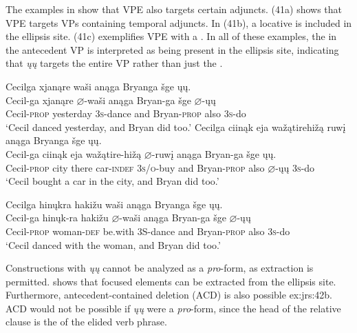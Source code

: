 \documentclass[output=paper]{LSP/langsci}
\begin{document}
The examples in  show that VPE also targets certain adjuncts. (41a) shows that VPE targets VPs containing temporal adjuncts. In (41b), a locative  is included in the ellipsis site. (41c) exemplifies VPE with a . In all of these examples, the  in the antecedent VP is interpreted as being present in the ellipsis site, indicating that \textit{\k{u}\k{u}} targets the entire VP rather than just the .

\begin{exe}
\ex\label{ex:jrs:41}
\begin{xlist}
\ex 
\glll Cecilga 			xjanąre		wa\v{s}i anąga	Bryanga			\v{s}ge  	\k{u}\k{u}.\\
Cecil-ga			xjanąre		$\varnothing$-wa\v{s}i		anąga	Bryan-ga			\v{s}ge		$\varnothing$-\k{u}\k{u} \\
	Cecil-\textsc{prop}		yesterday	\textsc{3s}-dance	and			Bryan-\textsc{prop}	also	\textsc{3s}-do \\
\trans `Cecil danced yesterday, and Bryan did too.'
\ex 
\glll Cecilga 			ciinąk	eja		wa\v{z}ątirehi\v{z}ą		ruw\k{i}	anąga	Bryanga			\v{s}ge  \k{u}\k{u}. \\
Cecil-ga			ciinąk	eja		wa\v{z}ątire-hi\v{z}ą	$\varnothing$-ruw\k{i}			anąga	Bryan-ga	\v{s}ge \k{u}\k{u}. \\
Cecil-\textsc{prop}	city there	car-\textsc{indef}	\textsc{3s/o}-buy and Bryan-\textsc{prop}	also $\varnothing$-\k{u}\k{u} \textsc{3s}-do \\
\trans `Cecil bought a car in the city, and Bryan did too.'

\ex 
\glll Cecilga 		hin\k{u}kra	haki\v{z}u		wa\v{s}i		anąga	Bryanga			\v{s}ge		\k{u}\k{u}.\\
Cecil-ga		hin\k{u}k-ra	haki\v{z}u		$\varnothing$-wa\v{s}i		anąga	Bryan-ga	\v{s}ge		$\varnothing$-\k{u}\k{u} \\	Cecil-\textsc{prop}		woman-\textsc{def} 	be.with		3S-dance	and			Bryan-\textsc{prop}	also	\textsc{3s}-do \\
\trans `Cecil danced with the woman, and Bryan did too.'
\end{xlist}
\end{exe}

Constructions with \textit{\k{u}\k{u}} cannot be analyzed as a \textit{pro}-form, as  extraction is permitted.  shows that focused elements can be extracted from the ellipsis site. Furthermore, antecedent-contained deletion (ACD) is also possible {ex:jrs:42b}. ACD would not be possible if \textit{\k{u}\k{u}} were a \textit{pro}-form, since the head of the relative clause is the  of the elided verb phrase.
\end{document}
